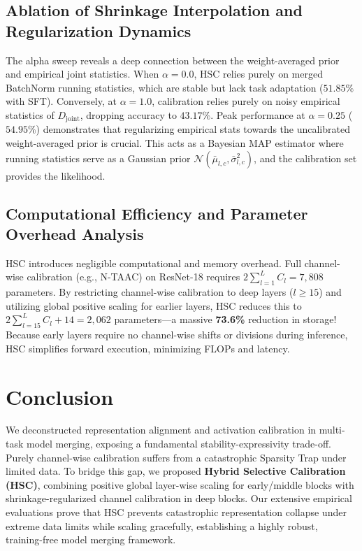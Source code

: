 \documentclass{article}
\begin{document}
\subsection{Ablation of Shrinkage Interpolation and Regularization Dynamics}
The alpha sweep reveals a deep connection between the weight-averaged prior and empirical joint statistics. When $\alpha=0.0$, HSC relies purely on merged BatchNorm running statistics, which are stable but lack task adaptation ($51.85\%$ with SFT). Conversely, at $\alpha=1.0$, calibration relies purely on noisy empirical statistics of $D_{\text{joint}}$, dropping accuracy to $43.17\%$. Peak performance at $\alpha=0.25$ ($54.95\%$) demonstrates that regularizing empirical stats towards the uncalibrated weight-averaged prior is crucial. This acts as a Bayesian MAP estimator where running statistics serve as a Gaussian prior $\mathcal{N}(\bar{\mu}_{l,c}, \bar{\sigma}^2_{l,c})$, and the calibration set provides the likelihood.

\subsection{Computational Efficiency and Parameter Overhead Analysis}
HSC introduces negligible computational and memory overhead. Full channel-wise calibration (e.g., N-TAAC) on ResNet-18 requires $2 \sum_{l=1}^L C_l = 7,808$ parameters. By restricting channel-wise calibration to deep layers ($l \ge 15$) and utilizing global positive scaling for earlier layers, HSC reduces this to $2 \sum_{l=15}^L C_l + 14 = 2,062$ parameters—a massive \textbf{73.6\%} reduction in storage! Because early layers require no channel-wise shifts or divisions during inference, HSC simplifies forward execution, minimizing FLOPs and latency.

\section{Conclusion}
We deconstructed representation alignment and activation calibration in multi-task model merging, exposing a fundamental stability-expressivity trade-off. Purely channel-wise calibration suffers from a catastrophic Sparsity Trap under limited data. To bridge this gap, we proposed \textbf{Hybrid Selective Calibration (HSC)}, combining positive global layer-wise scaling for early/middle blocks with shrinkage-regularized channel calibration in deep blocks. Our extensive empirical evaluations prove that HSC prevents catastrophic representation collapse under extreme data limits while scaling gracefully, establishing a highly robust, training-free model merging framework.
\end{document}
